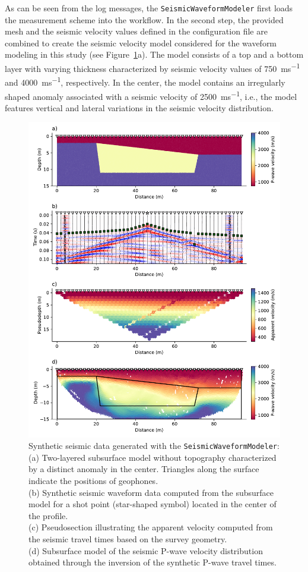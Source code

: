 \documentclass[a4paper,fleqn]{cas-sc}
\begin{document}
As can be seen from the log messages, the \texttt{SeismicWaveformModeler} first loads the measurement scheme into the workflow. In the second step, the provided mesh and the seismic velocity values defined in the configuration file are combined to create the seismic velocity model considered for the waveform modeling in this study (see Figure~\ref{fig:syndataexample}a). The model consists of a top and a bottom layer with varying thickness characterized by seismic velocity values of \qty{750}{ms^{-1}} and \qty{4000}{ms^{-1}}, respectively. In the center, the model contains an irregularly shaped anomaly associated with a seismic velocity of \qty{2500}{ms^{-1}}, i.e., the model features vertical and lateral variations in the seismic velocity distribution.
\begin{figure}
	\centering
	\includegraphics[width=.75\textwidth]{figures/synthetic_data_example.pdf}
	\caption{Synthetic seismic data generated with the \texttt{SeismicWaveformModeler}: \\(a) Two-layered subsurface model without topography characterized by a distinct anomaly in the center. Triangles along the surface indicate the positions of geophones. \\(b) Synthetic seismic waveform data computed from the subsurface model for a shot point (star-shaped symbol) located in the center of the profile. \\(c) Pseudosection illustrating the apparent velocity computed from the seismic travel times based on the survey geometry. \\(d) Subsurface model of the seismic P-wave velocity distribution obtained through the inversion of the synthetic P-wave travel times.}
	\label{fig:syndataexample}
\end{figure}
\end{document}
